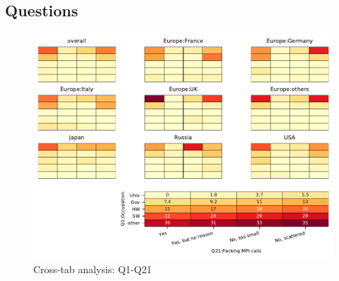 
\subsection{Questions}


\begin{figure}
\begin{center}
\includegraphics[width=12cm]{../pdfs/Q1-Q21.pdf}
\caption{Cross-tab analysis: Q1-Q21}
\label{fig:Q1-Q21}
\end{center}
\end{figure}
